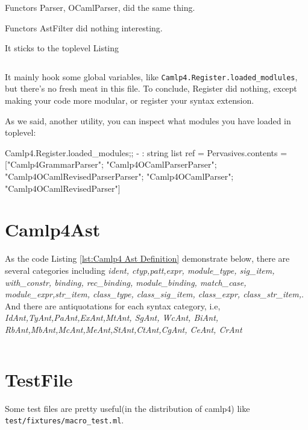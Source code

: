 Functors Parser, OCamlParser, did the same thing. 

Functors AstFilter  did nothing interesting.

It sticks to the toplevel Listing

\inputminted[fontsize=\scriptsize, firstline=123, lastline=126,
]{ocaml}{code/camp4/source/Register.ml}

It mainly hook some global variables, like
\verb|Camlp4.Register.loaded_modlules|, but there's no fresh meat in
this file.  To conclude, Register did nothing, except making your code
more modular, or register your syntax extension.

As we said, another utility, you can inspect what modules you have
loaded in toplevel:

\begin{ocamlcode}
Camlp4.Register.loaded_modules;;
- : string list ref =
{Pervasives.contents =
  ["Camlp4GrammarParser"; "Camlp4OCamlParserParser";
   "Camlp4OCamlRevisedParserParser"; "Camlp4OCamlParser";
   "Camlp4OCamlRevisedParser"]}
\end{ocamlcode}


\section{Camlp4Ast}

As the code Listing \ref{lst:Camlp4 Ast Definition} demonstrate below,
there are several categories including \textit{ident, ctyp,patt,expr,
  module\_type, sig\_item, with\_constr, binding, rec\_binding,
  module\_binding, match\_case, module\_expr,str\_item, class\_type,
  class\_sig\_item, class\_expr, class\_str\_item,}. And there are
antiquotations for each syntax category, i.e,
\textit{IdAnt,TyAnt,PaAnt,ExAnt,MtAnt, SgAnt, WcAnt, BiAnt,
  RbAnt,MbAnt,McAnt,MeAnt,StAnt,CtAnt,CgAnt, CeAnt, CrAnt}


\inputminted[fontsize=\scriptsize,
]{ocaml}{camlp4/code/ast/ast_def.ml}


\section{TestFile}
\label{sec:testfile}
Some test files are pretty useful(in the distribution of camlp4)
like \verb|test/fixtures/macro_test.ml|.
